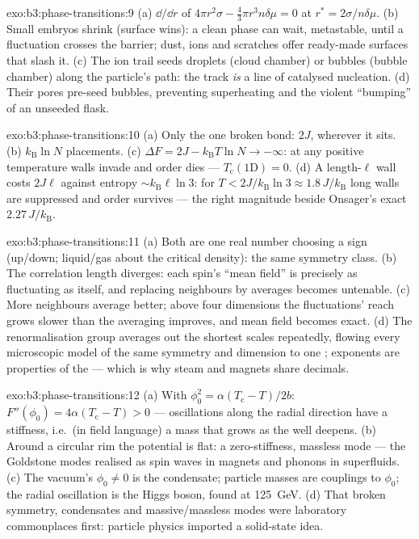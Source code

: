 \begin{solution}{exo:b3:phase-transitions:9}
(a) $\dd/\dd r$ of $4\pi r^2\sigma - \tfrac43\pi r^3n\delta\mu = 0$
at $r^* = 2\sigma/n\delta\mu$. (b) Small embryos shrink (surface
wins): a clean phase can wait, metastable, until a fluctuation
crosses the barrier; dust, ions and scratches offer ready-made
surfaces that slash it. (c) The ion trail seeds droplets (cloud
chamber) or bubbles (bubble chamber) along the particle's path:
the track \emph{is} a line of catalysed nucleation. (d) Their
pores pre-seed bubbles, preventing superheating and the violent
``bumping'' of an unseeded flask.
\end{solution}

\begin{solution}{exo:b3:phase-transitions:10}
(a) Only the one broken bond: $2J$, wherever it sits. (b)
$k_{\text{B}}\ln N$ placements. (c) $\Delta F = 2J -
k_{\text{B}}T\ln N \to -\infty$: at any positive temperature
walls invade and order dies --- $T_{\text{c}}(1\text{D}) = 0$. (d)
A length-$\ell$ wall costs $2J\ell$ against entropy
$\sim k_{\text{B}}\ell\ln3$: for $T < 2J/k_{\text{B}}\ln3 \approx
1.8\,J/k_{\text{B}}$ long walls are suppressed and order survives
--- the right magnitude beside Onsager's exact
$2.27\,J/k_{\text{B}}$.
\end{solution}

\begin{solution}{exo:b3:phase-transitions:11}
(a) Both  are one real number choosing a sign
(up/down; liquid/gas about the critical density): the same
symmetry class. (b) The correlation length diverges: each spin's
``mean field'' is precisely as fluctuating as itself, and
replacing neighbours by averages becomes untenable. (c) More
neighbours average better; above four dimensions the fluctuations'
reach grows slower than the averaging improves, and mean field
becomes exact. (d) The renormalisation group averages out the
shortest scales repeatedly, flowing every microscopic model of the
same symmetry and dimension to one ; exponents are
properties of the  --- which is why steam and magnets
share decimals.
\end{solution}

\begin{solution}{exo:b3:phase-transitions:12}
(a) With $\phi_0^2 = \alpha(T_{\text{c}} - T)/2b$: $F''(\phi_0) =
4\alpha(T_{\text{c}} - T) > 0$ --- oscillations along the radial
direction have a stiffness, i.e.\ (in field language) a mass that
grows as the well deepens. (b) Around a circular rim the
potential is flat: a zero-stiffness, massless mode --- the
Goldstone modes realised as spin waves in magnets and phonons in
superfluids. (c) The vacuum's $\phi_0 \neq 0$ is the condensate;
particle masses are couplings to $\phi_0$; the radial oscillation
is the Higgs boson, found at \qty{125}{GeV}. (d) That broken
symmetry, condensates and massive/massless modes were laboratory
commonplaces first: particle physics imported a solid-state idea.
\end{solution}

